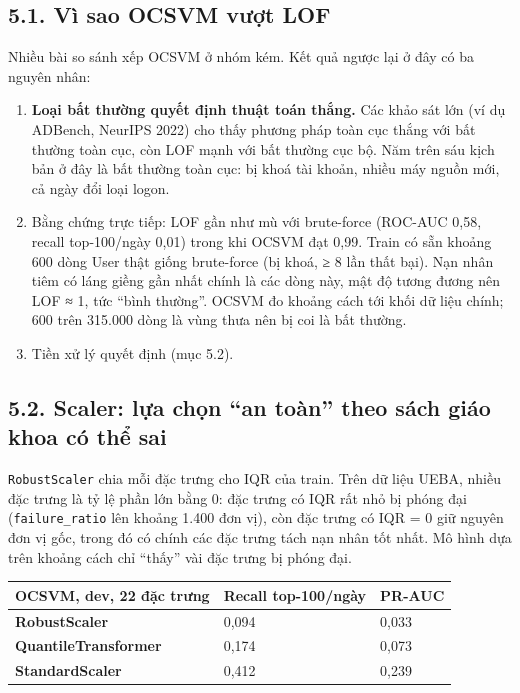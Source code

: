 \documentclass[
  11pt,
]{article}
\providecommand{\tightlist}{%
  \setlength{\itemsep}{0pt}\setlength{\parskip}{0pt}}
\begin{document}
\hypertarget{vuxec-sao-ocsvm-vux1b0ux1ee3t-lof}{%
\subsection{5.1. Vì sao OCSVM vượt
LOF}\label{vuxec-sao-ocsvm-vux1b0ux1ee3t-lof}}

Nhiều bài so sánh xếp OCSVM ở nhóm kém. Kết quả ngược lại ở đây có ba
nguyên nhân:

\begin{enumerate}
\def\labelenumi{\arabic{enumi}.}
\tightlist
\item
  \textbf{Loại bất thường quyết định thuật toán thắng.} Các khảo sát lớn
  (ví dụ ADBench, NeurIPS 2022) cho thấy phương pháp toàn cục thắng với
  bất thường toàn cục, còn LOF mạnh với bất thường cục bộ. Năm trên sáu
  kịch bản ở đây là bất thường toàn cục: bị khoá tài khoản, nhiều máy
  nguồn mới, cả ngày đổi loại logon.
\item
  Bằng chứng trực tiếp: LOF gần như mù với brute-force (ROC-AUC 0,58,
  recall top-100/ngày 0,01) trong khi OCSVM đạt 0,99. Train có sẵn
  khoảng 600 dòng User thật giống brute-force (bị khoá, ≥ 8 lần thất
  bại). Nạn nhân tiêm có láng giềng gần nhất chính là các dòng này, mật
  độ tương đương nên LOF ≈ 1, tức ``bình thường''. OCSVM đo khoảng cách
  tới khối dữ liệu chính; 600 trên 315.000 dòng là vùng thưa nên bị coi
  là bất thường.
\item
  Tiền xử lý quyết định (mục 5.2).
\end{enumerate}

\hypertarget{scaler-lux1ef1a-chux1ecdn-an-touxe0n-theo-suxe1ch-giuxe1o-khoa-cuxf3-thux1ec3-sai}{%
\subsection{5.2. Scaler: lựa chọn ``an toàn'' theo sách giáo khoa có thể
sai}\label{scaler-lux1ef1a-chux1ecdn-an-touxe0n-theo-suxe1ch-giuxe1o-khoa-cuxf3-thux1ec3-sai}}

\texttt{RobustScaler} chia mỗi đặc trưng cho IQR của train. Trên dữ liệu
UEBA, nhiều đặc trưng là tỷ lệ phần lớn bằng 0: đặc trưng có IQR rất nhỏ
bị phóng đại (\texttt{failure\_\allowbreak{}ratio} lên khoảng 1.400 đơn
vị), còn đặc trưng có IQR = 0 giữ nguyên đơn vị gốc, trong đó có chính
các đặc trưng tách nạn nhân tốt nhất. Mô hình dựa trên khoảng cách chỉ
``thấy'' vài đặc trưng bị phóng đại.

\begin{longtable}[]{@{}lll@{}}
\toprule\noalign{}
OCSVM, dev, 22 đặc trưng & Recall top-100/ngày & PR-AUC \\
\midrule\noalign{}
\endhead
\bottomrule\noalign{}
\endlastfoot
\textbf{RobustScaler} & 0,094 & 0,033 \\
\textbf{QuantileTransformer} & 0,174 & 0,073 \\
\textbf{StandardScaler} & 0,412 & 0,239 \\
\end{longtable}
\end{document}
